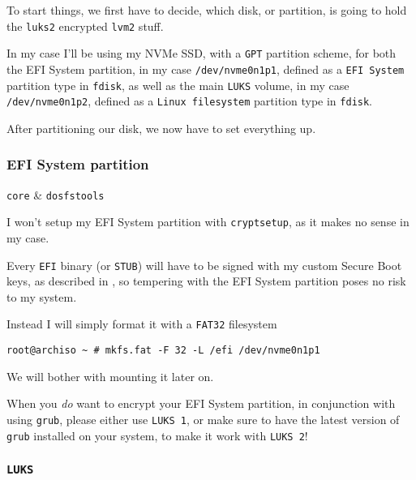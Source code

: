 \documentclass[10pt]{dustdoc}
\begin{document}
To start things, we first have to decide, which disk, or partition, is going to hold the \texttt{luks2} encrypted \texttt{lvm2} stuff.

In my case I’ll be using my NVMe SSD, with a \texttt{GPT} partition scheme, for both the EFI System partition, in my case \texttt{/dev/nvme0n1p1}, defined as a \texttt{EFI System} partition type in \texttt{fdisk}, as well as the main \texttt{LUKS} volume, in my case \texttt{/dev/nvme0n1p2}, defined as a \texttt{Linux filesystem} partition type in \texttt{fdisk}.

After partitioning our disk, we now have to set everything up.

\subsubsection{EFI System partition}
\label{sec:efi-system-partition}

\begin{packagetable}
    \texttt{core} & \texttt{dosfstools} \\
\end{packagetable}

I won’t setup my EFI System partition with \texttt{cryptsetup}, as it makes no sense in my case.

Every \texttt{EFI} binary (or \texttt{STUB}) will have to be signed with my custom Secure Boot keys, as described in , so tempering with the EFI System partition poses no risk to my system.

Instead I will simply format it with a \texttt{FAT32} filesystem

\begin{verbatim}
root@archiso ~ # mkfs.fat -F 32 -L /efi /dev/nvme0n1p1
\end{verbatim}

We will bother with mounting it later on.

\begin{NOTE}
    When you \emph{do} want to encrypt your EFI System partition, in conjunction with using \texttt{grub}, please either use \texttt{LUKS 1}, or make sure to have the latest version of \texttt{grub} installed on your system, to make it work with \texttt{LUKS 2}!
\end{NOTE}

\subsubsection{\texttt{LUKS}}
\label{sec:luks}
\end{document}
